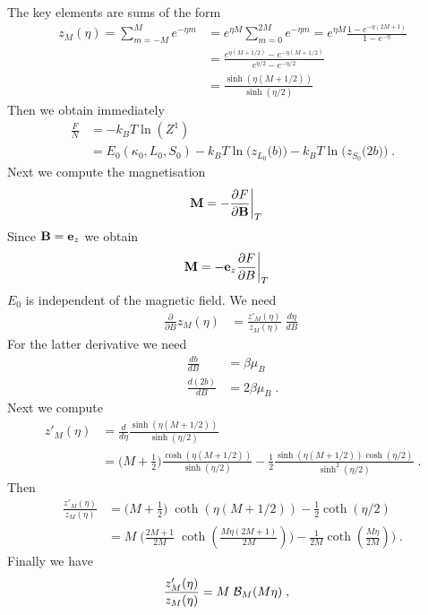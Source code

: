 The key elements are  sums of the form
%
\begin{align*}
{z}_{M}(\eta) =\sum_{m=-M}^{M} e^{-\eta m} &= e^{\eta M}\sum_{m=0}^{2M} e^{-\eta m}
=
e^{\eta M} \frac{1 - e^{-\eta (2 M+1)}}{1-e^{-\eta}}\\
&= \frac{e^{\eta(M+1/2)} - e^{-\eta (M+1/2)}}{e^{\eta/2}-e^{-\eta/2}}\\
&=\frac{\sinh(\eta(M+1/2))}{\sinh(\eta/2)}
\end{align*}
%
Then we obtain immediately
%
\begin{align*}
\frac{F}{N} &=  -  k_{B} T \ln(Z^{1})\\
&= E_{0}(\kappa_{0},L_{0},S_{0})
-k_{B}T \ln\bigg(z_{L_{0}}\big(b\big) \bigg)
-k_{B}T \ln\bigg(z_{S_{0}}\big(2 b\big)\bigg)\;.
\end{align*}
%
Next we compute the magnetisation
%
\begin{align*}
\mathbf M &= - \frac{\partial F}{\partial \mathbf B}\bigg|_{T}
\end{align*}
%
Since $\mathbf B = \mathbf e_{z}$ we obtain 
\begin{align*}
\mathbf M &= - \mathbf e_{z}\frac{\partial F}{\partial B}\bigg|_{T}
\end{align*}
%
$E_{0}$ is independent of the magnetic field. We need
%
\begin{align*}
\frac{\partial }{\partial B} z_{M}(\eta) &=
\frac{z'_{M}(\eta)}{z_{M}(\eta)} \;\frac{d \eta }{d B}\;
\end{align*}
%
For the latter derivative we need
%
\begin{align*}
\frac{d  b}{d B} &= \beta \mu_{B}\\
\frac{d (2 b)}{d B} &= 2\beta \mu_{B}\;.
\end{align*}
%
Next we compute 
%
\begin{align*}
z'_{M}(\eta) &= \frac{d}{d\eta} 
\frac{\sinh(\eta(M+1/2))}{\sinh(\eta/2)}\\
&=
\big( M+\frac{1}{2} \big)\frac{\cosh(\eta(M+1/2))}{\sinh(\eta/2)}
-\frac{1}{2}\frac{\sinh(\eta(M+1/2))\cosh(\eta/2)}{\sinh^{2}(\eta/2)}\;.
\end{align*}
%
Then
%
\begin{align*}
\frac{z'_{M}(\eta)}{z_{M}(\eta)}
&=\big( M+\frac{1}{2} \big)\;\coth(\eta(M+1/2))-\frac{1}{2}\coth(\eta/2)\\
&=M\;\bigg( \frac{2M+1}{2M}\;\coth(\frac{M\eta (2M+1)}{2M}))-\frac{1}{2M}\coth(\frac{M\eta}{2M})\bigg)\;.
\end{align*}
Finally we have
%
\begin{align}\label{eq:para:8}
\frac{z'_{M}(\eta)}{z_{M}(\eta)}&=M\; {\cal B}_{M}(M\eta)\;,
\end{align}
